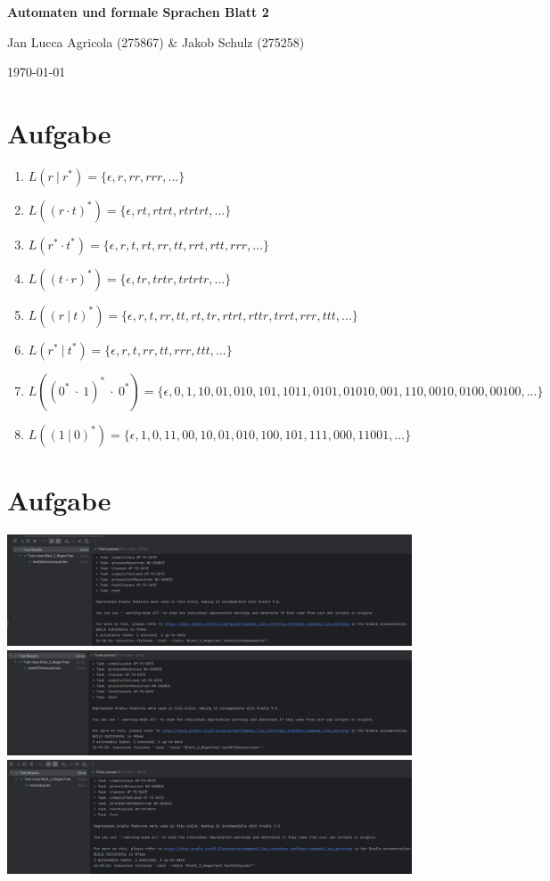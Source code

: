\documentclass[a4paper,12pt,titlepage]{article}
\begin{document}
\begin{titlepage}
    \centering
    \vspace*{2cm}
    {\LARGE\bfseries Automaten und formale Sprachen Blatt 2\par}
    \vspace{2cm}
    {\Large Jan Lucca Agricola (275867) \& Jakob Schulz (275258)\par}
    \vspace{2cm}
    {\large\today\par}
\end{titlepage}

\section{Aufgabe}
\begin{enumerate}
\item $L(r\ |\ r^*) = \{\epsilon, r, rr, rrr,...\}$
\item $L((r \cdot t)^*) = \{\epsilon, rt, rtrt, rtrtrt,...\}$
\item $L(r^* \cdot t^*) = \{\epsilon, r, t, rt, rr, tt, rrt, rtt, rrr,...\}$
\item $L((t \cdot r)^*) = \{\epsilon, tr, trtr, trtrtr,...\}$
\item $L((r\ |\ t)^*) = \{\epsilon, r, t, rr, tt, rt, tr, rtrt, rttr, trrt, rrr, ttt,...\}$
\item $L(r^*\ |\ t^*) = \{\epsilon, r, t, rr, tt, rrr, ttt,...\}$
\item $L((0^*\ \cdot\  1)^*\ \cdot\ 0^*) = \{\epsilon, 0, 1, 10, 01, 010, 101, 1011, 0101, 01010, 001, 110, 0010, 0100, 00100, ...\}$
\item $L((1\ |\ 0)^*) = \{\epsilon, 1, 0, 11, 00, 10, 01, 010, 100, 101, 111, 000, 11001,...\}$
\end{enumerate}
\section{Aufgabe}
\includegraphics[width=0.9\textwidth]{testGleitkommazahlen.png}\\
\includegraphics[width=0.9\textwidth]{testKFZKennzeichen.png}\\
\includegraphics[width=0.9\textwidth]{testZeitpunkt.png}\\
\end{document}
